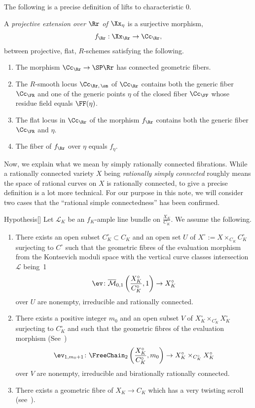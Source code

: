 The following is a precise definition of lifts to characteristic $0$.


\begin{defi}\label{defn-lift-b}
A \emph{projective extension over $\Rr$ of $\Xx_\eta$} is a surjective morphism,
\[
f_\Rr :\Xx_\Rr \to \Cc_\Rr,
\]
between projective, flat, $R$-schemes satisfying the following.
\begin{enumerate}
\item \label{list1.1.1}The morphism $\Cc_\Rr\to \SP \Rr$ has connected geometric fibers.
\item \label{list1.1.2}The $R$-smooth locus $\Cc_{\Rr,\,\sm}$ of $\Cc_\Rr$ contains both the generic fiber $\Cc_\FR$ and one of the generic points $\eta$ of the closed fiber $\Cc_\FF$ whose residue field equals $\FF(\eta)$.
\item \label{list1.1.3}The flat locus in $\Cc_\Rr$ of the morphism $f_\Rr$ contains both the generic fiber $\Cc_\FR$ and $\eta$.
\item \label{list1.1.4}The fiber of $f_\Rr$ over $\eta$ equals $f_\eta$.
\end{enumerate}
\end{defi}


Now, we explain what we mean by simply rationally connected fibrations. While a rationally connected variety $X$ being \emph{rationally simply connected} roughly means the space of rational curves on $X$ is rationally connected, to give a precise definition is a lot more technical. For our purpose in this note, we will consider two cases that the ``rational simple connectedness'' has been confirmed.

\begin{enonce}
{Hypothesis}[\cite{dJHS}]\label{h-dJHS}
Let $\mathcal{L}_K$ be an $f_K$-ample line bundle on $\frac{X_K}{C_K}$. We assume the
following.
\begin{enumerate}
\item \label{list1.2.1}There exists an open subset $C^{\circ}_K\subset C_K$ and an open set $U$ of $X^{\circ}:=X\times_{C_K}{C^{\circ}_K}$ surjecting to $C^{\circ}$ such that the geometric fibres of the evaluation morphism from the Kontsevich moduli space with the vertical curve classes intersection $\mathcal{L}$ being~1
\[
\ev \colon \overline{\mathcal{M}}_{0,1}\left(\frac{X^{\circ}_K}{C^{\circ}_K}, 1\right)\to X^{\circ}_K
\]
over $U$ are nonempty, irreducible and rationally connected.
\item \label{list1.2.2} There exists a positive integer $m_0$ and an open subset $V$ of $X^{\circ}_K\times_{C^{\circ}_K} X^{\circ}_K$ surjecting to $C^{\circ}_K$ and such that the geometric fibres of the evaluation morphism (See~\cite[P.~30]{dJHS})
\[
\ev_{1,m_0+1} \colon \FreeChain_2\left(\frac{X^{\circ}_K}{C^{\circ}_K},m_0\right) \to X^{\circ}_K\times_{C^{\circ}_K} X^{\circ}_K
\]
over $V$ are nonempty, irreducible and birationally rationally connected.
\item \label{list1.2.3} There exists a geometric fibre of $X_K\to C_K$ which has a very twisting scroll (see~\cite[Definition~12.3]{dJHS}).
\end{enumerate}
\end{enonce}

